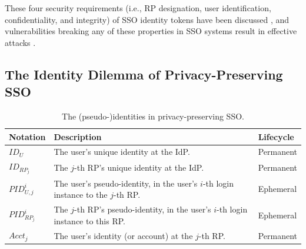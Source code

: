 These four security requirements (i.e., RP designation, user identification, confidentiality, and integrity) of SSO identity tokens
     have been discussed \cite{ArmandoCCCT08,FettKS16, FettKS17},
     and
     vulnerabilities breaking any of these properties in SSO systems
            result in effective attacks \cite{SomorovskyMSKJ12, WangCW12, ArmandoCCCPS13, ZhouE14, WangZLLYLG15, WangZLG16, YangLLZH16, MainkaMS16, MainkaMSW17, YangLCZ18, YangLS17, ShiWL19, ChenPCTKT14, ccsSunB12, DiscoveringJCS, dimvaLiM16, CaoSBKVC14, TowardsShehabM14}.




\subsection{The Identity Dilemma of Privacy-Preserving SSO}
\label{subsec:challenges}
\begin{table}[t]
\footnotesize
    \caption{The (pseudo-)identities in privacy-preserving SSO.}
    \centering
    \begin{tabular}{|p{1.0cm}|p{5.1cm}|p{1.13cm}|} \hline
    {\textbf{Notation}} & {\textbf{Description}} & {\textbf{Lifecycle}} \\ \hline
    {$ID_U$} & {The user's unique identity at the IdP.} & {Permanent} \\ \hline
    {$ID_{RP_j}$} & {The $j$-th RP's unique identity at the IdP.} & {Permanent} \\ \hline
    {$PID_{U,j}^i$} & {The user's pseudo-identity, in the user's $i$-th login instance to the $j$-th RP.} & {Ephemeral} \\ \hline
    {$PID_{RP_j}^i$} & {The $j$-th RP's pseudo-identity, in the user's $i$-th login instance to this RP.} & {Ephemeral} \\ \hline
    {$Acct_j$} & {The user's identity (or account) at the $j$-th RP.} & {Permanent} \\ \hline
    \end{tabular}
    \label{tbl:notations-dilemma}
\end{table}



